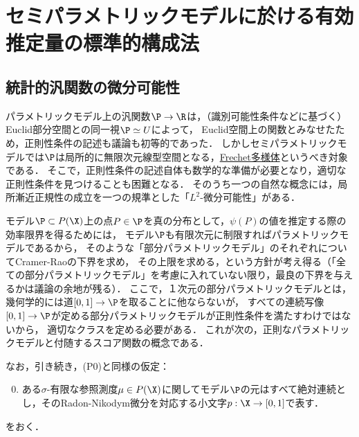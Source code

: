 \documentclass[uplatex, dvipdfmx]{jsarticle}
\begin{document}
\section{セミパラメトリックモデルに於ける有効推定量の標準的構成法}

\subsection{統計的汎関数の微分可能性}

\begin{tcolorbox}[colframe=ForestGreen, colback=ForestGreen!10!white,breakable,colbacktitle=ForestGreen!40!white,coltitle=black,fonttitle=\bfseries\sffamily,
title=]
    パラメトリックモデル上の汎関数$\P\to\R$は，（識別可能性条件などに基づく）Euclid部分空間との同一視$\P\simeq U$によって，
    Euclid空間上の関数とみなせたため，正則性条件の記述も議論も初等的であった．
    しかしセミパラメトリックモデルでは$\P$は局所的に無限次元線型空間となる，\href{https://ncatlab.org/nlab/show/Fr%C3%A9chet+manifold}{Frechet多様体}というべき対象である．
    そこで，正則性条件の記述自体も数学的な準備が必要となり，適切な正則性条件を見つけることも困難となる．
    そのうち一つの自然な概念には，局所漸近正規性の成立を一つの規準とした「$L^2$-微分可能性」がある．
\end{tcolorbox}

モデル$\P\subset P(\X)$上の点$P\in\P$を真の分布として，$\psi(P)$の値を推定する際の効率限界を得るためには，
モデル$\P$も有限次元に制限すればパラメトリックモデルであるから，
そのような「部分パラメトリックモデル」のそれぞれについてCramer-Raoの下界を求め，
その上限を求める，という方針が考え得る（「全ての部分パラメトリックモデル」を考慮に入れていない限り，最良の下界を与えるかは議論の余地が残る）．
ここで，１次元の部分パラメトリックモデルとは，
幾何学的には道$[0,1]\to\P$を取ることに他ならないが，
すべての連続写像$[0,1]\to\P$が定める部分パラメトリックモデルが正則性条件を満たすわけではないから，
適切なクラスを定める必要がある．
これが次の，正則なパラメトリックモデルと付随するスコア関数の概念である．

なお，引き続き，(P0)と同様の仮定：
\begin{enumerate}[({S}1)]\setcounter{enumi}{-1}
    \item ある$\sigma$-有限な参照測度$\mu\in P(\X)$に関してモデル$\P$の元はすべて絶対連続とし，そのRadon-Nikodym微分を対応する小文字$p:\X\to[0,1]$で表す．
\end{enumerate}
をおく．
\end{document}
